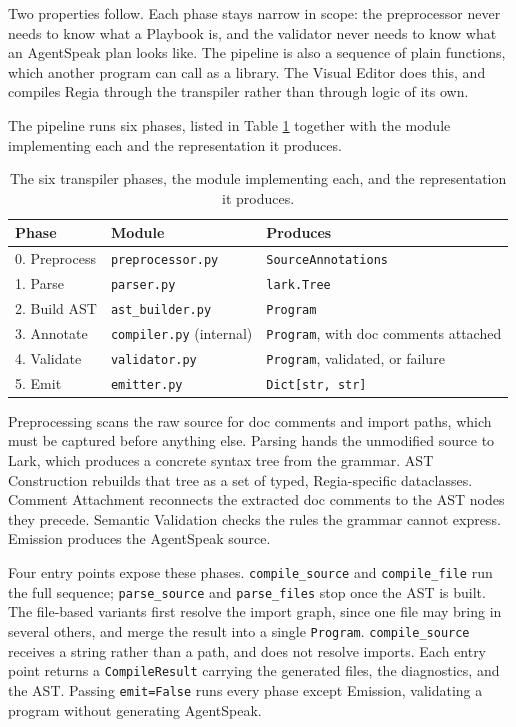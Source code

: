 Two properties follow. Each phase stays narrow in scope: the preprocessor never needs to know what a Playbook is, and the validator never needs to know what an AgentSpeak plan looks like. The pipeline is also a sequence of plain functions, which another program can call as a library. The Visual Editor does this, and compiles Regia through the transpiler rather than through logic of its own.
 
The pipeline runs six phases, listed in Table \ref{tab:pipeline-phases} together with the module implementing each and the representation it produces.
 
\begin{table}[h]
\centering
\begin{tabular}{|l|l|l|}
\hline
\textbf{Phase} & \textbf{Module} & \textbf{Produces} \\
\hline
0. Preprocess & \lstinline|preprocessor.py| & \lstinline|SourceAnnotations| \\
1. Parse      & \lstinline|parser.py|       & \lstinline|lark.Tree| \\
2. Build AST  & \lstinline|ast_builder.py| & \lstinline|Program| \\
3. Annotate   & \lstinline|compiler.py| (internal) & \lstinline|Program|, with doc comments attached \\
4. Validate   & \lstinline|validator.py|    & \lstinline|Program|, validated, or failure \\
5. Emit       & \lstinline|emitter.py|      & \lstinline|Dict[str, str]| \\
\hline
\end{tabular}
\caption{The six transpiler phases, the module implementing each, and the representation it produces.}
\label{tab:pipeline-phases}
\end{table}
 
Preprocessing scans the raw source for doc comments and import paths, which must be captured before anything else. Parsing hands the unmodified source to Lark, which produces a concrete syntax tree from the grammar. AST Construction rebuilds that tree as a set of typed, Regia-specific dataclasses. Comment Attachment reconnects the extracted doc comments to the AST nodes they precede. Semantic Validation checks the rules the grammar cannot express. Emission produces the AgentSpeak source.
 
Four entry points expose these phases. \lstinline|compile_source| and \lstinline|compile_file| run the full sequence; \lstinline|parse_source| and \lstinline|parse_files| stop once the AST is built. The file-based variants first resolve the import graph, since one file may bring in several others, and merge the result into a single \lstinline|Program|. \lstinline|compile_source| receives a string rather than a path, and does not resolve imports. Each entry point returns a \lstinline|CompileResult| carrying the generated files, the diagnostics, and the AST. Passing \lstinline|emit=False| runs every phase except Emission, validating a program without generating AgentSpeak.
 
